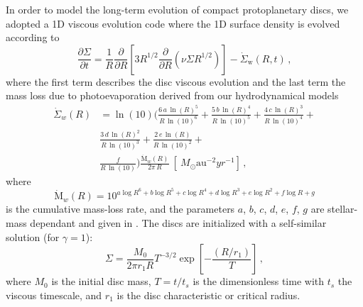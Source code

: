 \documentclass[letters,fleqn,usenatbib]{mnras}
\begin{document}
In order to model the long-term evolution of compact protoplanetary discs, we adopted a 1D viscous evolution code \citep{2015MNRAS.450.3008E} where the 1D surface density is evolved according to
\begin{equation}\label{eq:visc}
\frac{\partial\Sigma}{\partial t} = \frac{1}{R} \frac{\partial}{\partial R} \left[ 3R^{1/2} \frac{\partial}{\partial R} \left( \nu\Sigma R^{1/2} \right)\right] - \dot{\Sigma}_{\mathrm{w}}(R, t)\,,
\end{equation}
where the first term describes the disc viscous evolution \citep{1974MNRAS.168..603L} and the last term the mass loss due to photoevaporation derived from our hydrodynamical models \citep{2021MNRAS.508.3611P}
\begin{eqnarray}
  \label{eq:surf1}
  \dot{\Sigma}_w(R) &= \ln{(10)} \bigg(\frac{6\, a\, \ln{(R)}^5}{R\, \ln{(10)}^6} +
  \frac{5\, b\, \ln{(R)}^4}{R\, \ln{(10)}^5} +
  \frac{4\, c\, \ln{(R)}^3}{R\, \ln{(10)}^4} + \\ \nonumber
  &\frac{3\, d\, \ln{(R)}^2}{R\, \ln{(10)}^3} +
  \frac{2\, e\, \ln{(R)}}{R\, \ln{(10)}^2} + \\ \nonumber
  &\frac{f}{R\, \ln{(10)}}\bigg)
  \frac{\dot{\mathrm{M}}_w(R)}{2\pi\, R} \ [\SI{}{M_\odot \textrm{au}^{-2} yr^{-1}}]\,,
\end{eqnarray}
where 
\begin{equation}
\label{eq:surf2}
  \dot{\mathrm{M}}_w(R) = 10^{a\log{R}^6 + b\log{R}^5 + c\log{R}^4 + d\log{R}^3 + e\log{R}^2 + f\log{R} + g}
\end{equation}
is the cumulative mass-loss rate, and the parameters $a$, $b$, $c$, $d$, $e$, $f$, $g$ are stellar-mass dependant and given in \citet[][Table 2]{2021MNRAS.508.3611P}.
The discs are initialized with a self-similar solution (for $\gamma = 1$):
\begin{equation}
    \Sigma = \frac{M_0}{2 \pi r_1 R} T^{-3/2} \exp{\left[-\frac{(R/r_1)}{T}\right]}\,,
\end{equation}
where $M_0$ is the initial disc mass, $T=t/t_s$ is the dimensionless time with $t_s$ the viscous timescale, and $r_1$ is the disc characteristic or critical radius.
\end{document}
